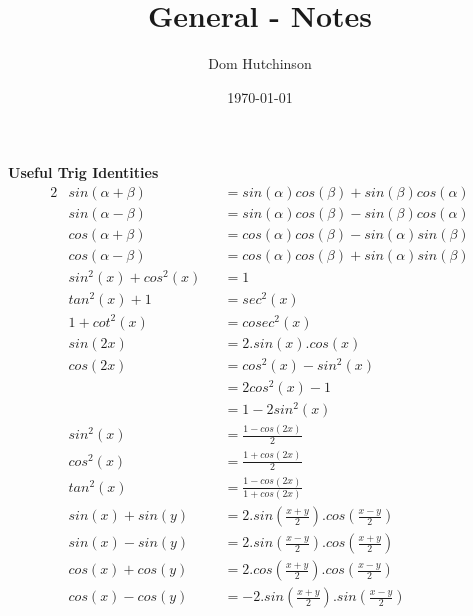 \documentclass[11pt,a4paper]{article}
\begin{document}
\pagestyle{fancy}
\setlength\parindent{0pt}
\allowdisplaybreaks

\renewcommand{\headrulewidth}{0pt}
\newcommand{\vect}[1]{\boldsymbol{#1}}
\newcommand{\subtitle}[2]{\textbf{#1}\textit{#2} \\}
\newcommand{\dotprod}[0]{\boldsymbol{\cdot}}

\title{General - Notes}
\author{Dom Hutchinson}
\date{\today}
\maketitle

\fancyhead[R]{\today}

\textbf{Useful Trig Identities}
\begin{alignat*}{2}
  &sin(\alpha + \beta) &&= sin(\alpha)cos(\beta) + sin(\beta)cos(\alpha) \\
  &sin(\alpha - \beta) &&= sin(\alpha)cos(\beta) - sin(\beta)cos(\alpha) \\
  &cos(\alpha + \beta) &&= cos(\alpha)cos(\beta) - sin(\alpha)sin(\beta) \\
  &cos(\alpha - \beta) &&= cos(\alpha)cos(\beta) + sin(\alpha)sin(\beta) \\
  &sin^2(x) + cos^2(x) &&= 1 \\
  &tan^2(x) + 1 &&= sec^2(x) \\
  &1 + cot^2(x) &&= cosec^2(x) \\
  &sin(2x) &&= 2.sin(x).cos(x) \\
  &cos(2x) &&= cos^2(x) - sin^2(x)\\
  & &&= 2cos^2(x) - 1 \\
  & &&= 1 - 2sin^2(x) \\
  &sin^2(x) &&= \frac{1 - cos(2x)}{2} \\
  &cos^2(x) &&= \frac{1 + cos(2x)}{2} \\
  &tan^2(x) &&= \frac{1-cos(2x)}{1 + cos(2x)} \\
  &sin(x) + sin(y) &&= 2.sin\left(\frac{x+y}{2}\right).cos\left(\frac{x-y}{2}\right) \\
  &sin(x) - sin(y) &&= 2.sin\left(\frac{x-y}{2}\right).cos\left(\frac{x+y}{2}\right) \\
  &cos(x) + cos(y) &&= 2.cos\left(\frac{x+y}{2}\right).cos\left(\frac{x-y}{2}\right) \\
  &cos(x) - cos(y) &&= -2.sin\left(\frac{x+y}{2}\right).sin\left(\frac{x-y}{2}\right)
\end{alignat*}
\end{document}
